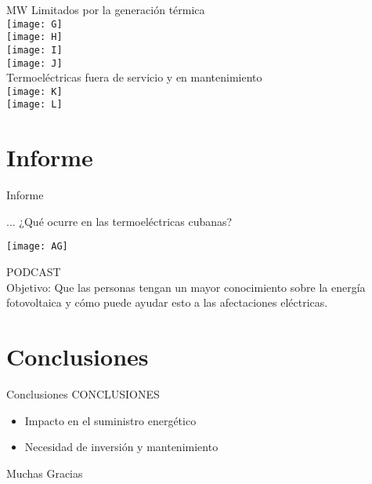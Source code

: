 \documentclass{beamer}
\begin{document}
    \newpage
    \vspace{1cm}
    \LARGE{MW Limitados por la generación térmica}\\
    \vspace{0.5cm}
    \texttt{[image: G]}\\
    \vspace{1cm}
    \texttt{[image: H]}\\
    \vspace{1cm}
    \texttt{[image: I]}\\
    \vspace{1cm}
    \texttt{[image: J]}\\
    
    \newpage
    \vspace{1cm}
    \LARGE{Termoeléctricas fuera de servicio y en mantenimiento}\\
    \vspace{0.5cm}
    \texttt{[image: K]}\\
    \vspace{1cm}
    \texttt{[image: L]}

    \newpage
    \section{Informe}
    \begin{frame}{Informe}
        \begin{block}{...}
            ¿Qué ocurre en las termoeléctricas cubanas?
        \end{block}
        \vspace{1cm}
        \texttt{[image: AG]}\\
    \end{frame}

\newpage
\large{PODCAST}\\
\vspace{1cm}
Objetivo: Que las personas tengan un mayor conocimiento sobre la energía fotovoltaica y cómo puede ayudar esto a las afectaciones eléctricas.

\newpage
\section{Conclusiones}
\begin{frame}{Conclusiones}
    \centering
    \huge{CONCLUSIONES}\\
    \begin{itemize}
        \item Impacto en el suministro energético
        \item Necesidad de inversión y mantenimiento

    \end{itemize}
    \vspace{3cm}
    Muchas Gracias
\end{frame}
\end{document}
